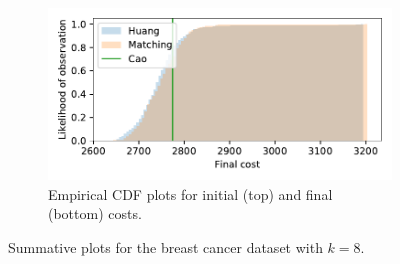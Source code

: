 \documentclass[smallextended]{svjour3}
\begin{document}
\begin{figure}
\begin{subfigure}{.5\textwidth}
        \includegraphics[width=\linewidth]{Fig1b2.pdf}
        \caption{Empirical CDF plots for initial (top) and final (bottom)
                 costs.}
    \end{subfigure}
    \caption{Summative plots for the breast cancer dataset with \(k=8\).}%
    \label{fig:breast_cancer_knee}
\end{figure}
\end{document}
